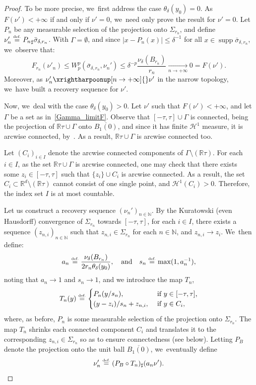 \documentclass[JEP,XML,SOM,Unicode,NoFloatCountersInSection,published]{cedram}
\theoremstyle{definition}
\newcommand{\eqdef}{\ensuremath{\stackrel{\mbox{\upshape\tiny def.}}{=}}}
\newcommand\cH{\mathcal{H}}
\newcommand{\RR}{\mathbb{R}}
\DeclareMathOperator{\supp}{supp}
\newcommand{\abs}[1]{\left\lvert#1\right\rvert}
\begin{document}
\begin{proof}
To be more precise, we~first address the case $\theta_\delta(y_0)=0$. As $F(\nu')<+\infty$ if and only if $\nu'=0$, we~need only prove the result for $\nu'=0$. Let $P_n$ be any measurable selection of the projection onto ${\Sigma_{r_n}}$, and define $\nu_n'\eqdef {P_n}_{\sharp} \bar \sigma_{\delta, r_n}$. With $\Gamma=\emptyset$, and since $\abs{x-P_n(x)}\le \delta^{-1}$ for all $x\in \supp \bar \sigma_{\delta,r_n}$, we~observe that:
\[
F_{r_n}(\nu'_n)\le W_p^p(\bar \sigma_{\delta, r_n},\nu_n')\le \delta^{-p} \frac{\nu_\delta(B_{r_n})}{r_n} \xrightarrow[n\to +\infty]{} 0 = F(\nu').
\]
Moreover, as $\nu'_n \xrightharpoonup[n \to +\infty]{} \nu'$ in the narrow topology, we~have built a recovery sequence for $\nu'$.

Now, we~deal with the case $\theta_{\delta}(y_0)>0$. Let $\nu'$ such that $F(\nu') < +\infty$, and let $\Gamma$ be a set as in~\eqref{Gamma_limitF}. Observe that $[-\tau,\tau]\cup \Gamma$ is connected, being the projection of $\RR\tau\cup \Gamma$ onto $\overline{B_1(0)}$, and since it has finite $\cH^1$ measure, it is arcwise connected, by~\cite[Prop.\,30.1, Cor.\,30.2]{david2006singular}. As a result, $\RR\tau\cup\Gamma$ is arcwise connected too.

Let $(C_{i})_{i\in I}$ denote the arcwise connected components of $\Gamma\setminus (\RR\tau)$. For each $i \in I$, as the set $\RR\tau\cup \Gamma$ is arcwise connected, one may check that there exists some $z_i\in [-\tau,\tau]$ such that $\{z_{i}\}\cup C_{i}$ is arcwise connected. As a result, the set $C_{i} \subset \RR^{d}\setminus(\RR\tau)$ cannot consist of one single point, and $\cH^1(C_i)>0$. Therefore, the index set $I$ is at most countable.

Let us construct a recovery sequence $(\nu_n')_{n\in \mathbb{N}}$. By the Kuratowski (even Hausdorff) convergence of $\Sigma_{r_{n}}$
towards $[-\tau,\tau]$, for each $i\in I$, there exists a sequence $(z_{n,i})_{n\in \mathbb{N}}$ such that $z_{n,i}\in \Sigma_{r_{n}}$ for each $n\in \mathbb{N}$, and $z_{n,i}\to z_i$. We~then define:
\begin{equation*}
a_n\eqdef \frac{\nu_{\delta}(B_{r_n})}{2r_n\theta_{\delta}(y_0)},
\quad\mbox{and}\quad
s_n\eqdef \max(1,a_{n}^{-1}),
\end{equation*}
noting that $a_n\to 1$ and $s_n\to 1$, and we introduce the map $T_n$,
\[
T_n(y)
\eqdef
\begin{cases}
P_n(y/s_{n}),& \text{ if $y \in [-\tau, \tau]$,} \\
(y-z_{i})/s_n+z_{n,i},& \text{ if $y \in C_i$},
\end{cases}
\]
where, as before, $P_n$ is some measurable selection of the projection onto ${\Sigma_{r_n}}$. The map $T_n$ shrinks each connected component $C_i$ and translates it to the corresponding $z_{n,i} \in \Sigma_{r_n}$ so as to ensure connectedness (see below). Letting $P_B$ denote the projection onto the unit ball $\overline{B_1(0)}$, we~eventually define
\[
\nu_n'\eqdef (P_B\circ T_n)_{\sharp}(a_n\nu').
\]


\end{proof}
\end{document}
